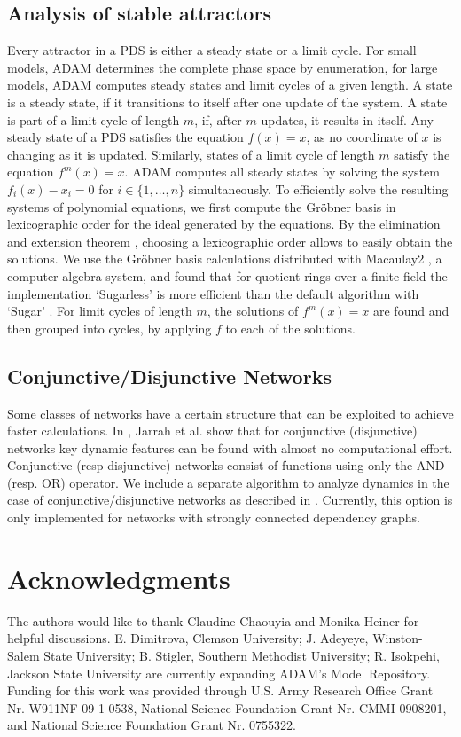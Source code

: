 \documentclass[10pt]{bmc_article}
\begin{document}
\subsection{Analysis of stable attractors}
Every attractor in a PDS is either a
steady state or a limit cycle. For small models, ADAM determines the complete
phase space by enumeration, for large models, ADAM computes steady states and
limit cycles of a given length.
A state is a steady state, if it transitions to itself after one update of the
system. A state is part of a limit cycle of length $m$, if,
after $m$ updates, it results in itself. Any steady state of a PDS satisfies
the equation $f(x) = x$, as no coordinate of $x$ is changing as it is updated.
Similarly, states of a
limit cycle of length $m$ satisfy the equation $f^m(x) = x$. ADAM computes all
steady states by solving the system $f_i(x) - x_i = 0$ for $i \in \{1, \ldots,
n\}$ simultaneously. To efficiently solve the resulting systems of polynomial
equations, we first compute the Gr\"obner
basis in lexicographic order for the ideal generated by the equations.
By the elimination and extension theorem \cite{IVA}, choosing a lexicographic order
allows to easily obtain the solutions.
We use the Gr\"obner basis calculations distributed with Macaulay2 \cite{M2}, a
computer algebra system, and found that for quotient rings over a finite field
the implementation `Sugarless' is more efficient than the default algorithm
with `Sugar' \cite{Sugar:1991}.
For limit cycles of length $m$, the solutions of $f^m(x)=x$ are found and then
grouped into cycles, by applying $f$ to each of the solutions.
\subsection{Conjunctive/Disjunctive Networks} \label{sec:conj}
Some classes of networks have a certain structure that can be
exploited to achieve faster calculations. In \cite{conjunctive}, Jarrah et al.
show that for conjunctive (disjunctive) networks key dynamic features can be found with
almost no computational effort. Conjunctive (resp disjunctive) networks consist of
functions using only the AND (resp. OR) operator.
We include a separate algorithm to analyze
dynamics in the case of conjunctive/disjunctive networks as described in
\cite{conjunctive}. Currently,
this option is only implemented for networks with strongly connected dependency graphs.
\section*{Acknowledgments}
The authors would like to thank Claudine Chaouyia and Monika Heiner for helpful discussions. E. Dimitrova, Clemson University; J. Adeyeye, Winston-Salem State University; B. Stigler, Southern Methodist University; R. Isokpehi, Jackson State University are currently expanding ADAM’s Model Repository.
Funding for this work was provided through U.S. Army Research Office Grant Nr. W911NF-09-1-0538,
National Science Foundation Grant Nr. CMMI-0908201, and National Science Foundation Grant Nr. 0755322.



%

\end{document}

